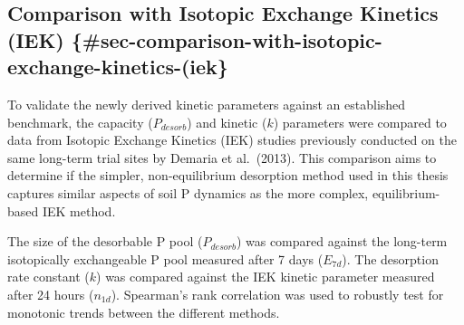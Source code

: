 \documentclass[
  a4paper,
]{article}
\begin{document}
\subsection{Comparison with Isotopic Exchange Kinetics (IEK)
\{\#sec-comparison-with-isotopic-exchange-kinetics-(iek\}}\label{comparison-with-isotopic-exchange-kinetics-iek-sec-comparison-with-isotopic-exchange-kinetics-iek}

To validate the newly derived kinetic parameters against an established
benchmark, the capacity (\(P_{desorb}\)) and kinetic (\(k\)) parameters
were compared to data from Isotopic Exchange Kinetics (IEK) studies
previously conducted on the same long-term trial sites by Demaria et
al.~(2013). This comparison aims to determine if the simpler,
non-equilibrium desorption method used in this thesis captures similar
aspects of soil P dynamics as the more complex, equilibrium-based IEK
method.

The size of the desorbable P pool (\(P_{desorb}\)) was compared against
the long-term isotopically exchangeable P pool measured after 7 days
(\(E_{7d}\)). The desorption rate constant (\(k\)) was compared against
the IEK kinetic parameter measured after 24 hours (\(n_{1d}\)).
Spearman's rank correlation was used to robustly test for monotonic
trends between the different methods.
\end{document}
